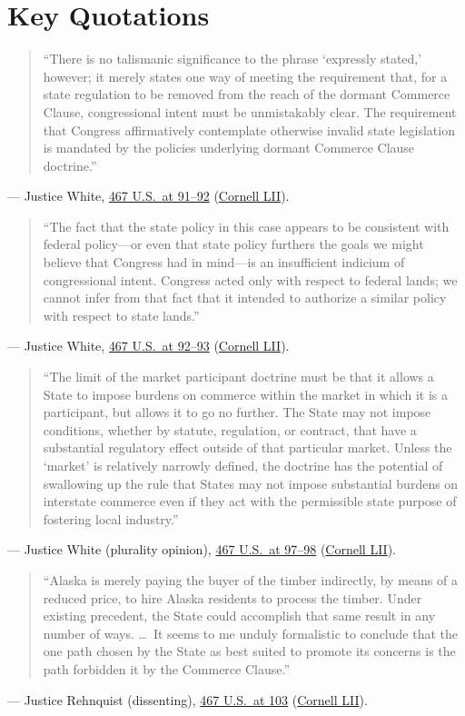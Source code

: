 \documentclass[12pt]{article}
\begin{document}
\section{Key Quotations}
\begin{quote}
``There is no talismanic significance to the phrase `expressly stated,' however; it merely states one way of meeting the requirement that, for a state regulation to be removed from the reach of the dormant Commerce Clause, congressional intent must be unmistakably clear. The requirement that Congress affirmatively contemplate otherwise invalid state legislation is mandated by the policies underlying dormant Commerce Clause doctrine.''
\end{quote}
\noindent --- Justice White, \href{https://supreme.justia.com/cases/federal/us/467/82/}{467 U.S.\ at 91--92} (\href{https://www.law.cornell.edu/supremecourt/text/467/82}{Cornell LII}).

\begin{quote}
``The fact that the state policy in this case appears to be consistent with federal policy---or even that state policy furthers the goals we might believe that Congress had in mind---is an insufficient indicium of congressional intent. Congress acted only with respect to federal lands; we cannot infer from that fact that it intended to authorize a similar policy with respect to state lands.''
\end{quote}
\noindent --- Justice White, \href{https://supreme.justia.com/cases/federal/us/467/82/}{467 U.S.\ at 92--93} (\href{https://www.law.cornell.edu/supremecourt/text/467/82}{Cornell LII}).

\begin{quote}
``The limit of the market participant doctrine must be that it allows a State to impose burdens on commerce within the market in which it is a participant, but allows it to go no further. The State may not impose conditions, whether by statute, regulation, or contract, that have a substantial regulatory effect outside of that particular market. Unless the `market' is relatively narrowly defined, the doctrine has the potential of swallowing up the rule that States may not impose substantial burdens on interstate commerce even if they act with the permissible state purpose of fostering local industry.''
\end{quote}
\noindent --- Justice White (plurality opinion), \href{https://supreme.justia.com/cases/federal/us/467/82/}{467 U.S.\ at 97--98} (\href{https://www.law.cornell.edu/supremecourt/text/467/82}{Cornell LII}).

\begin{quote}
``Alaska is merely paying the buyer of the timber indirectly, by means of a reduced price, to hire Alaska residents to process the timber. Under existing precedent, the State could accomplish that same result in any number of ways. \dots\ It seems to me unduly formalistic to conclude that the one path chosen by the State as best suited to promote its concerns is the path forbidden it by the Commerce Clause.''
\end{quote}
\noindent --- Justice Rehnquist (dissenting), \href{https://supreme.justia.com/cases/federal/us/467/82/}{467 U.S.\ at 103} (\href{https://www.law.cornell.edu/supremecourt/text/467/82}{Cornell LII}).
\end{document}
